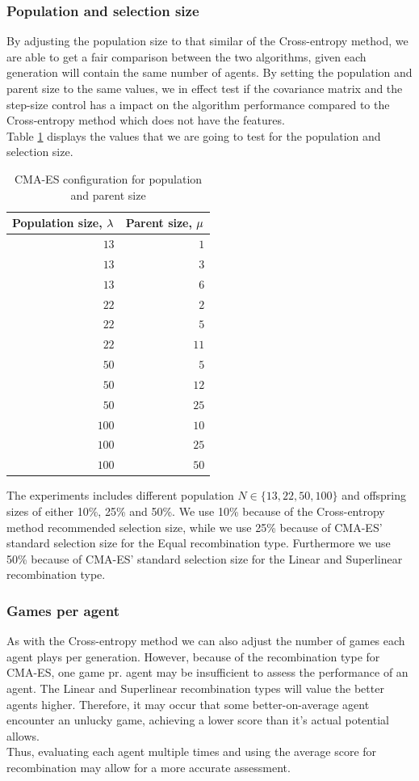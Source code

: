 \subsubsection{Population and selection size}
By adjusting the population size to that similar of the Cross-entropy method, we are able
to get a fair comparison between the two algorithms, given each generation will
contain the same number of agents. By setting the population and parent size
to the same values, we in effect test if the covariance matrix and the step-size
control has a impact on the algorithm performance compared to the Cross-entropy method
which does not have the features.\\
Table \ref{CMAPopulationSelectionConfigTest} displays the values that we are going
to test for the population and selection size.


\begin{table}[H]
\centering
\begin{tabular}{r r}
Population size, $\lambda$ & Parent size, $\mu$\\
\hline
$13$ & $1$\\
$13$ & $3$\\
$13$ & $6$\\
$22$ & $2$\\
$22$ & $5$\\
$22$ & $11$\\
$50$ & $5$\\
$50$ & $12$\\
$50$ & $25$\\
$100$ & $10$\\
$100$ & $25$\\
$100$ & $50$
\end{tabular}
\caption{CMA-ES configuration for population and parent size \label{CMAPopulationSelectionConfigTest}}
\end{table}

The experiments includes different population $N \in \{13,22,50,100\}$ and offspring sizes of either
10\%, 25\% and 50\%. We use 10\% because of the Cross-entropy method recommended selection size, while
we use 25\% because of CMA-ES' standard selection size for the Equal recombination type. 
Furthermore we use 50\% because of CMA-ES' standard selection size for the Linear and Superlinear 
recombination type.

\subsubsection{Games per agent \label{CMAGamesPerAgentSection}}
As with the Cross-entropy method we can also adjust the number of games each agent plays per generation.
However, because of the recombination type for CMA-ES, one game pr. agent may  be insufficient to assess the
performance of an agent. The Linear and Superlinear recombination types will value the better agents higher.
Therefore, it may occur that some better-on-average agent encounter an unlucky game, achieving a lower score than
it's actual potential allows. \\
Thus, evaluating each agent multiple times and using the average score for recombination may allow for a more accurate assessment.\\


